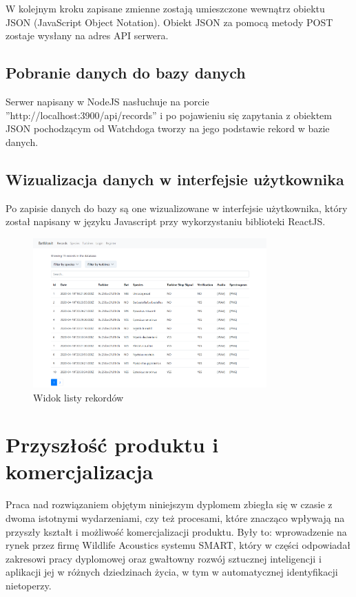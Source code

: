\documentclass{sprz}
\begin{document}
W kolejnym kroku zapisane zmienne zostają umieszczone wewnątrz obiektu JSON (JavaScript Object Notation). Obiekt JSON za pomocą metody POST zostaje wysłany na adres API serwera.

\section{Pobranie danych do bazy danych}
Serwer napisany w NodeJS nasłuchuje na porcie ”http://localhost:3900/api/records” i po pojawieniu się zapytania z obiektem JSON pochodzącym od Watchdoga tworzy na jego podstawie rekord w bazie danych.

\section{Wizualizacja danych w interfejsie użytkownika}
Po zapisie danych do bazy są one wizualizowane w interfejsie użytkownika, który został napisany w języku Javascript przy wykorzystaniu biblioteki ReactJS.

\begin{figure}[h]
  \centering
  \includegraphics[width=0.8\textwidth]{sprz/app_records}
  \caption{Widok listy rekordów}
  \label{img:app_records}
\end{figure}

\chapter{Przyszłość produktu i komercjalizacja}

Praca nad rozwiązaniem objętym niniejszym dyplomem zbiegła się w czasie z dwoma istotnymi wydarzeniami, czy też procesami, które znacząco wpływają na przyszły kształt i możliwość komercjalizacji produktu. Były to: wprowadzenie na rynek przez firmę Wildlife Acoustics systemu SMART, który w części odpowiadał zakresowi pracy dyplomowej oraz gwałtowny rozwój sztucznej inteligencji i aplikacji jej w różnych dziedzinach życia, w tym w automatycznej identyfikacji nietoperzy.
\end{document}
